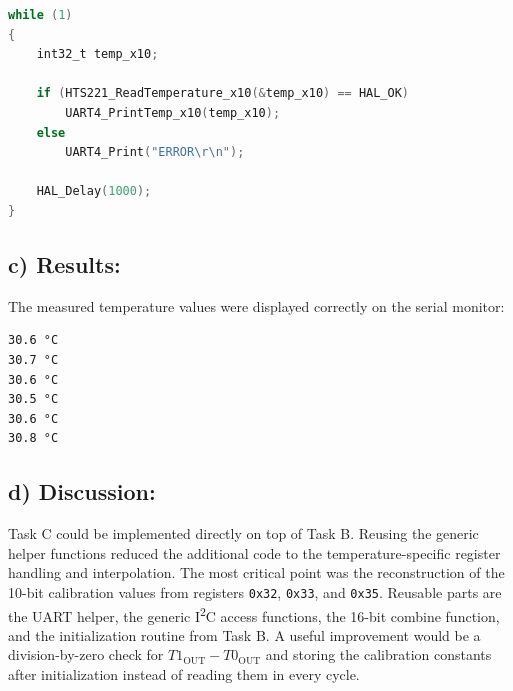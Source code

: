 \begin{lstlisting}[language=C,caption={Temperature measurement loop in main()}]
while (1)
{
    int32_t temp_x10;

    if (HTS221_ReadTemperature_x10(&temp_x10) == HAL_OK)
        UART4_PrintTemp_x10(temp_x10);
    else
        UART4_Print("ERROR\r\n");

    HAL_Delay(1000);
}
\end{lstlisting}

\subsection{c) Results:}

The measured temperature values were displayed correctly on the serial monitor:

\begin{lstlisting}[caption={UART output of the temperature measurement}]
30.6 °C
30.7 °C
30.6 °C
30.5 °C
30.6 °C
30.8 °C
\end{lstlisting}

\subsection{d) Discussion:}

Task C could be implemented directly on top of Task B. Reusing the generic helper functions reduced the additional code to the temperature-specific register handling and interpolation. The most critical point was the reconstruction of the 10-bit calibration values from registers \texttt{0x32}, \texttt{0x33}, and \texttt{0x35}. Reusable parts are the UART helper, the generic I\textsuperscript{2}C access functions, the 16-bit combine function, and the initialization routine from Task B. A useful improvement would be a division-by-zero check for $T1_{\mathrm{OUT}} - T0_{\mathrm{OUT}}$ and storing the calibration constants after initialization instead of reading them in every cycle.
